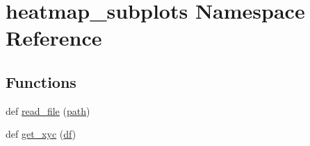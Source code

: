 \hypertarget{namespaceheatmap__subplots}{}\section{heatmap\+\_\+subplots Namespace Reference}
\label{namespaceheatmap__subplots}
\subsection*{Functions}
\begin{DoxyCompactItemize}
\item 
def \hyperlink{namespaceheatmap__subplots_ad7968080746de03ee0c2965d50fe0ebd}{read\+\_\+file} (\hyperlink{namespaceheatmap__subplots_ab7df7a9753e857e63f1f8b0490859a31}{path})
\item 
def \hyperlink{namespaceheatmap__subplots_aa29417a7896e55be0a2a79e1ac33efdc}{get\+\_\+xyc} (\hyperlink{namespaceheatmap__subplots_aefdcfb560a154ac398cf52bf39a33cb0}{df})
\end{DoxyCompactItemize}
